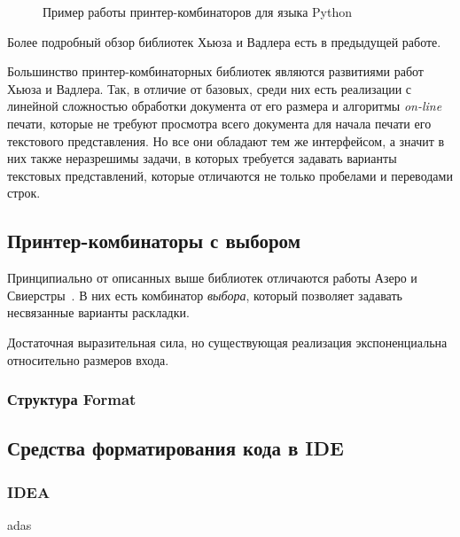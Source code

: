 \begin{figure}[h!]
	\centering
	\null\hfill
	\null\hfill
	\hfill\null
	\caption{Пример работы принтер-комбинаторов для языка Python}
  \label{fig:seqEx}	
\end{figure}

Более подробный обзор библиотек Хьюза и Вадлера есть в предыдущей работе\cite{myCoursePaper}.

Большинство принтер-комбинаторных библиотек\cite{
swierstraChitil, swierstra04, peytonJones, kiselyov, chitil}
являются развитиями работ Хьюза и Вадлера. Так, в отличие от базовых, среди
них есть реализации с линейной сложностью обработки документа от его размера и 
алгоритмы \emph{on-line} печати, которые не требуют просмотра всего документа
для начала печати его текстового представления. Но все они обладают тем же
интерфейсом, а значит в них также неразрешимы задачи, в которых требуется
задавать варианты текстовых представлений, которые отличаются не только
пробелами и переводами строк.

\subsection{Принтер-комбинаторы с выбором}

Принципиально от описанных выше библиотек отличаются работы
Азеро и Свиерстры~\cite{swierstra, swiComb}.
В них есть комбинатор \emph{выбора}, который позволяет задавать несвязанные варианты
раскладки. 

Достаточная выразительная сила, но существующая реализация экспоненциальна
относительно размеров входа.

\subsubsection{Структура Format}

\subsection{Средства форматирования кода в IDE}

\subsubsection{IDEA}
adas
